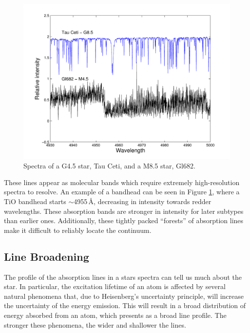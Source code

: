 \begin{figure}
\centering
\includegraphics[width=\textwidth]{TauCetiGl682_comparison.pdf}
\caption{Spectra of a G4.5 star, Tau Ceti, and a M8.5 star, Gl682.}
\label{FigSpec}
\end{figure}
These lines appear as molecular bands which require extremely high-resolution spectra to resolve. An example of a bandhead can be seen in Figure \ref{FigSpec}, where a TiO bandhead starts $\sim$4955\,\AA, decreasing in intensity towards redder wavelengths. These absorption bands are stronger in intensity for later subtypes than earlier ones. Additionally, these tightly packed ``forests'' of absorption lines make it difficult to reliably locate the continuum.\\
\subsection{Line Broadening}
\label{SecBroad}
The profile of the absorption lines in a stars spectra can tell us much about the star. In particular, the excitation lifetime of an atom is affected by several natural phenomena that, due to Heisenberg's uncertainty principle, will increase the uncertainty of the energy emission. This will result in a broad distribution of energy absorbed from an atom, which presents as a broad line profile. The stronger these phenomena, the wider and shallower the lines.\\

